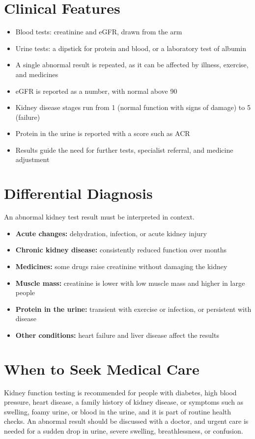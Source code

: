 \section*{Clinical Features}
\begin{itemize}
    \item Blood tests: creatinine and eGFR, drawn from the arm
    \item Urine tests: a dipstick for protein and blood, or a laboratory test of albumin
    \item A single abnormal result is repeated, as it can be affected by illness, exercise, and medicines
    \item eGFR is reported as a number, with normal above 90
    \item Kidney disease stages run from 1 (normal function with signs of damage) to 5 (failure)
    \item Protein in the urine is reported with a score such as ACR
    \item Results guide the need for further tests, specialist referral, and medicine adjustment
\end{itemize}

\section*{Differential Diagnosis}
An abnormal kidney test result must be interpreted in context.
\begin{itemize}
    \item \textbf{Acute changes:} dehydration, infection, or acute kidney injury
    \item \textbf{Chronic kidney disease:} consistently reduced function over months
    \item \textbf{Medicines:} some drugs raise creatinine without damaging the kidney
    \item \textbf{Muscle mass:} creatinine is lower with low muscle mass and higher in large people
    \item \textbf{Protein in the urine:} transient with exercise or infection, or persistent with disease
    \item \textbf{Other conditions:} heart failure and liver disease affect the results
\end{itemize}

\section*{When to Seek Medical Care}
Kidney function testing is recommended for people with diabetes, high blood pressure, heart disease, a family history of kidney disease, or symptoms such as swelling, foamy urine, or blood in the urine, and it is part of routine health checks. An abnormal result should be discussed with a doctor, and urgent care is needed for a sudden drop in urine, severe swelling, breathlessness, or confusion.

